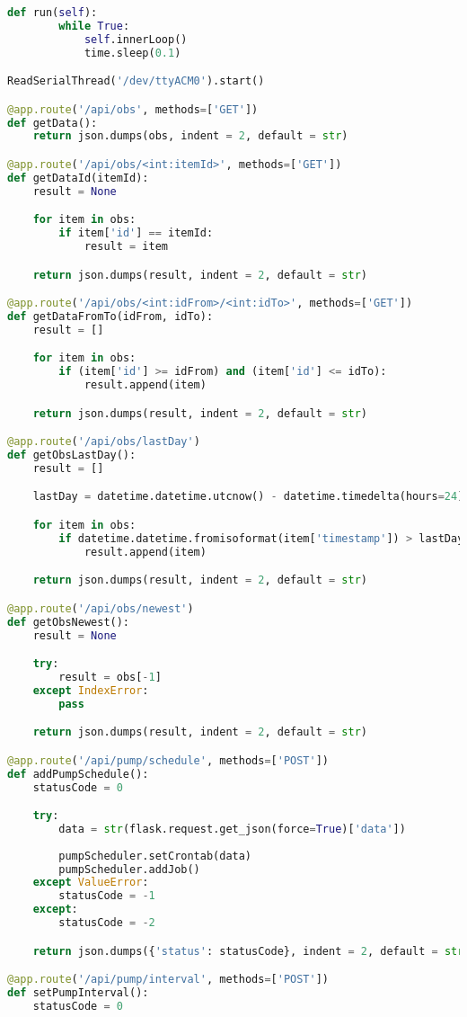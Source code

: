 \documentclass[a4paper,12pt,twoside,openright,titlepage]{book}
\begin{document}
\begin{lstlisting}[title={raspberrypi/api/data.py}, language=Python]
    def run(self):
        while True:
            self.innerLoop()
            time.sleep(0.1)

ReadSerialThread('/dev/ttyACM0').start()

@app.route('/api/obs', methods=['GET'])
def getData():
    return json.dumps(obs, indent = 2, default = str)

@app.route('/api/obs/<int:itemId>', methods=['GET'])
def getDataId(itemId):
    result = None

    for item in obs:
        if item['id'] == itemId:
            result = item

    return json.dumps(result, indent = 2, default = str)

@app.route('/api/obs/<int:idFrom>/<int:idTo>', methods=['GET'])
def getDataFromTo(idFrom, idTo):
    result = []

    for item in obs:
        if (item['id'] >= idFrom) and (item['id'] <= idTo):
            result.append(item)

    return json.dumps(result, indent = 2, default = str)

@app.route('/api/obs/lastDay')
def getObsLastDay():
    result = []

    lastDay = datetime.datetime.utcnow() - datetime.timedelta(hours=24)

    for item in obs:
        if datetime.datetime.fromisoformat(item['timestamp']) > lastDay:
            result.append(item)

    return json.dumps(result, indent = 2, default = str)

@app.route('/api/obs/newest')
def getObsNewest():
    result = None

    try:
        result = obs[-1]
    except IndexError:
        pass

    return json.dumps(result, indent = 2, default = str)

@app.route('/api/pump/schedule', methods=['POST'])
def addPumpSchedule():
    statusCode = 0

    try:
        data = str(flask.request.get_json(force=True)['data'])
        
        pumpScheduler.setCrontab(data)
        pumpScheduler.addJob()
    except ValueError:
        statusCode = -1
    except:
        statusCode = -2

    return json.dumps({'status': statusCode}, indent = 2, default = str)

@app.route('/api/pump/interval', methods=['POST'])
def setPumpInterval():
    statusCode = 0


\end{lstlisting}
\end{document}
